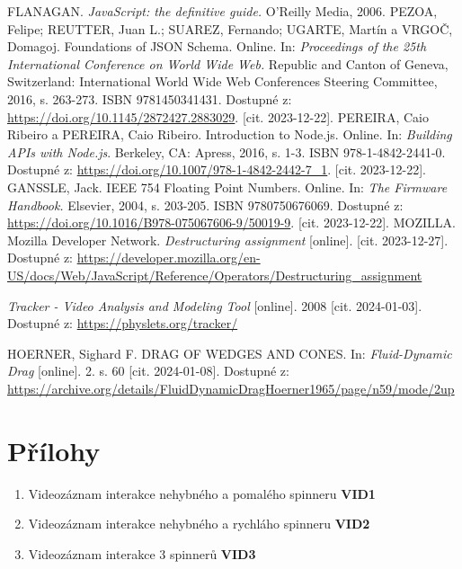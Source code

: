 \documentclass[12pt, a4paper,
 twoside,        %
 openright
]{report}
\begin{document}
\begin{thebibliography}{99}
     FLANAGAN. \textit{JavaScript: the definitive guide.} O'Reilly Media, 2006.
     PEZOA, Felipe; REUTTER, Juan L.; SUAREZ, Fernando; UGARTE, Martín a VRGOČ, Domagoj. Foundations of JSON Schema. Online. In: \textit{Proceedings of the 25th International Conference on World Wide Web.} Republic and Canton of Geneva, Switzerland: International World Wide Web Conferences Steering Committee, 2016, s. 263-273. ISBN 9781450341431. Dostupné z: \url{https://doi.org/10.1145/2872427.2883029}. [cit. 2023-12-22].
     PEREIRA, Caio Ribeiro a PEREIRA, Caio Ribeiro. Introduction to Node.js. Online. In: \textit{Building APIs with Node.js}. Berkeley, CA: Apress, 2016, s. 1-3. ISBN 978-1-4842-2441-0. Dostupné z: \url{https://doi.org/10.1007/978-1-4842-2442-7_1}. [cit. 2023-12-22].
    GANSSLE, Jack. IEEE 754 Floating Point Numbers. Online. In: \textit{The Firmware Handbook.} Elsevier, 2004, s. 203-205. ISBN 9780750676069. Dostupné z: \url{https://doi.org/10.1016/B978-075067606-9/50019-9}. [cit. 2023-12-22].
     MOZILLA. Mozilla Developer Network. \textit{Destructuring assignment} [online]. [cit. 2023-12-27]. Dostupné z: \url{https://developer.mozilla.org/en-US/docs/Web/JavaScript/Reference/Operators/Destructuring_assignment}

     \textit{Tracker - Video Analysis and Modeling Tool} [online]. 2008 [cit. 2024-01-03]. Dostupné z: \url{https://physlets.org/tracker/}

     HOERNER, Sighard F. DRAG OF WEDGES AND CONES. In: \textit{Fluid-Dynamic Drag} [online]. 2. s. 60 [cit. 2024-01-08]. Dostupné z: \url{https://archive.org/details/FluidDynamicDragHoerner1965/page/n59/mode/2up}
\end{thebibliography}

\listoffigures

\listoftables

\lstlistoflistings


\chapter*{Přílohy}
\begin{enumerate}[topsep=0pt, partopsep=0pt]
    \setlength{\itemsep}{0pt}%
    \setlength{\parskip}{0pt}%
    \item \label{attachment_1} Videozáznam interakce nehybného a pomalého spinneru \dotfill \textbf{VID1}
    \item \label{attachment_2} Videozáznam interakce nehybného a rychláho spinneru \dotfill \textbf{VID2}
    \item \label{attachment_3} Videozáznam interakce 3 spinnerů \dotfill \textbf{VID3}
\end{enumerate}
\end{document}

